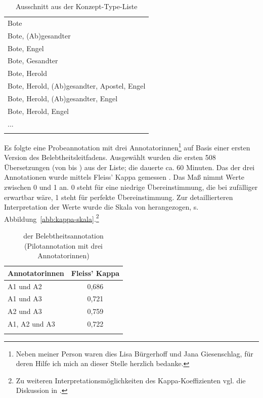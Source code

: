 \begin{table}
\centering
\begin{tabular}{l}
\lsptoprule
\multicolumn{1}{c}{Übersetzung (Konzept-Type)}    \\ \midrule
Bote                                        \\
Bote, (Ab)gesandter                         \\
Bote, Engel                                 \\
Bote, Gesandter                             \\
Bote, Herold                                \\
Bote, Herold, (Ab)gesandter, Apostel, Engel \\
Bote, Herold, (Ab)gesandter, Engel          \\
Bote, Herold, Engel                         \\
...                                         \\ \lspbottomrule
\end{tabular}
\caption{Ausschnitt aus der Konzept-Type-Liste\label{tab:konzept-types}}
\end{table}

Es folgte eine Probeannotation  mit drei Annotatorinnen\footnote{Neben meiner Person waren dies Lisa Bürgerhoff und Jana Giesenschlag, für deren Hilfe ich mich an dieser Stelle herzlich bedanke.} auf Basis einer ersten Version des Belebtheitsleitfadens. Ausgewählt wurden die ersten 508 Übersetzungen (von  bis ) aus der Liste; die  dauerte ca. 60 Minuten. Das  der drei Annotationen wurde mittels Fleiss' Kappa gemessen \parencite{Fleiss1971}. Das Maß nimmt Werte zwischen 0 und 1 an. 
0 steht für eine niedrige Übereinstimmung, die bei zufälliger  erwartbar wäre, 1 steht für perfekte Übereinstimmung. Zur detaillierteren Interpretation der Werte wurde die Skala von \textcite{Landis1977} herangezogen, s. Abbildung~\ref{abb:kappa-skala}.\footnote{Zu weiteren Interpretationsmöglichkeiten des Kappa-Koeffizienten vgl. die Diskussion in \textcite[576--577]{Artstein2008}.}

\begin{table}
\centering
\label{tab:iaa-pilot}
\begin{tabular}{lc}
\lsptoprule
Annotatorinnen & Fleiss' Kappa  \\ \midrule
A1 und A2               & 0,686  \\
A1 und A3               & 0,721  \\
A2 und A3               & 0,759  \\
A1, A2 und A3           & 0,722  \\ \lspbottomrule
\end{tabular}
\caption{ der Belebtheitsannotation (Pilotannotation mit drei Annotatorinnen)}
\end{table}

